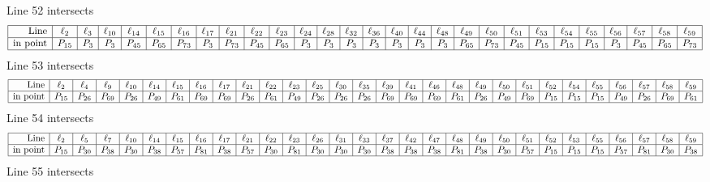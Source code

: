 \documentclass{article}
\begin{document}
{Line 52 intersects 
$$
\begin{array}{|r*{27}{|c}|}
\hline
\mbox{Line}  & \ell_{2} & \ell_{3} & \ell_{10} & \ell_{14} & \ell_{15} & \ell_{16} & \ell_{17} & \ell_{21} & \ell_{22} & \ell_{23} & \ell_{24} & \ell_{28} & \ell_{32} & \ell_{36} & \ell_{40} & \ell_{44} & \ell_{48} & \ell_{49} & \ell_{50} & \ell_{51} & \ell_{53} & \ell_{54} & \ell_{55} & \ell_{56} & \ell_{57} & \ell_{58} & \ell_{59}\\
\hline
\mbox{in point}  & P_{15} & P_{3} & P_{3} & P_{45} & P_{65} & P_{73} & P_{3} & P_{73} & P_{45} & P_{65} & P_{3} & P_{3} & P_{3} & P_{3} & P_{3} & P_{3} & P_{3} & P_{65} & P_{73} & P_{45} & P_{15} & P_{15} & P_{15} & P_{3} & P_{45} & P_{65} & P_{73}\\
\hline
\end{array}
$$
Line 53 intersects 
$$
\begin{array}{|r*{28}{|c}|}
\hline
\mbox{Line}  & \ell_{2} & \ell_{4} & \ell_{9} & \ell_{10} & \ell_{14} & \ell_{15} & \ell_{16} & \ell_{17} & \ell_{21} & \ell_{22} & \ell_{23} & \ell_{25} & \ell_{30} & \ell_{35} & \ell_{39} & \ell_{41} & \ell_{46} & \ell_{48} & \ell_{49} & \ell_{50} & \ell_{51} & \ell_{52} & \ell_{54} & \ell_{55} & \ell_{56} & \ell_{57} & \ell_{58} & \ell_{59}\\
\hline
\mbox{in point}  & P_{15} & P_{26} & P_{69} & P_{26} & P_{49} & P_{61} & P_{69} & P_{69} & P_{26} & P_{61} & P_{49} & P_{26} & P_{26} & P_{26} & P_{69} & P_{69} & P_{69} & P_{61} & P_{26} & P_{49} & P_{69} & P_{15} & P_{15} & P_{15} & P_{49} & P_{26} & P_{69} & P_{61}\\
\hline
\end{array}
$$
Line 54 intersects 
$$
\begin{array}{|r*{28}{|c}|}
\hline
\mbox{Line}  & \ell_{2} & \ell_{5} & \ell_{7} & \ell_{10} & \ell_{14} & \ell_{15} & \ell_{16} & \ell_{17} & \ell_{21} & \ell_{22} & \ell_{23} & \ell_{26} & \ell_{31} & \ell_{33} & \ell_{37} & \ell_{42} & \ell_{47} & \ell_{48} & \ell_{49} & \ell_{50} & \ell_{51} & \ell_{52} & \ell_{53} & \ell_{55} & \ell_{56} & \ell_{57} & \ell_{58} & \ell_{59}\\
\hline
\mbox{in point}  & P_{15} & P_{30} & P_{38} & P_{30} & P_{38} & P_{57} & P_{81} & P_{38} & P_{57} & P_{30} & P_{81} & P_{30} & P_{30} & P_{30} & P_{38} & P_{38} & P_{38} & P_{81} & P_{38} & P_{30} & P_{57} & P_{15} & P_{15} & P_{15} & P_{57} & P_{81} & P_{30} & P_{38}\\
\hline
\end{array}
$$
Line 55 intersects 
$$
\begin{array}{|r*{28}{|c}|}

\end{array}$$}
\end{document}
